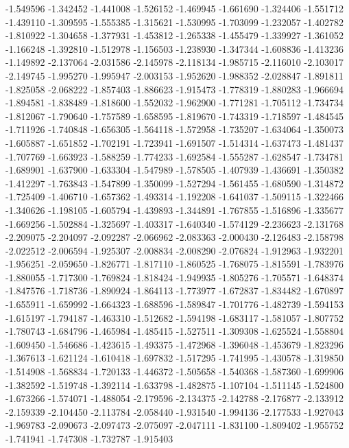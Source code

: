 -1.549596
-1.342452
-1.441008
-1.526152
-1.469945
-1.661690
-1.324406
-1.551712
-1.439110
-1.309595
-1.555385
-1.315621
-1.530995
-1.703099
-1.232057
-1.402782
-1.810922
-1.304658
-1.377931
-1.453812
-1.265338
-1.455479
-1.339927
-1.361052
-1.166248
-1.392810
-1.512978
-1.156503
-1.238930
-1.347344
-1.608836
-1.413236
-1.149892
-2.137064
-2.031586
-2.145978
-2.118134
-1.985715
-2.116010
-2.103017
-2.149745
-1.995270
-1.995947
-2.003153
-1.952620
-1.988352
-2.028847
-1.891811
-1.825058
-2.068222
-1.857403
-1.886623
-1.915473
-1.778319
-1.880283
-1.966694
-1.894581
-1.838489
-1.818600
-1.552032
-1.962900
-1.771281
-1.705112
-1.734734
-1.812067
-1.790640
-1.757589
-1.658595
-1.819670
-1.743319
-1.718597
-1.484545
-1.711926
-1.740848
-1.656305
-1.564118
-1.572958
-1.735207
-1.634064
-1.350073
-1.605887
-1.651852
-1.702191
-1.723941
-1.691507
-1.514314
-1.637473
-1.481437
-1.707769
-1.663923
-1.588259
-1.774233
-1.692584
-1.555287
-1.628547
-1.734781
-1.689901
-1.637900
-1.633304
-1.547989
-1.578505
-1.407939
-1.436691
-1.350382
-1.412297
-1.763843
-1.547899
-1.350099
-1.527294
-1.561455
-1.680590
-1.314872
-1.725409
-1.406710
-1.657362
-1.493314
-1.192208
-1.641037
-1.509115
-1.322466
-1.340626
-1.198105
-1.605794
-1.439893
-1.344891
-1.767855
-1.516896
-1.335677
-1.669256
-1.502884
-1.325697
-1.403317
-1.640340
-1.574129
-2.236623
-2.131768
-2.209075
-2.204097
-2.092287
-2.066962
-2.083363
-2.000430
-2.126483
-2.158798
-2.022512
-2.006594
-1.925307
-2.008834
-2.008290
-2.076824
-1.912963
-1.932201
-1.956251
-2.059650
-1.826771
-1.817110
-1.860525
-1.768075
-1.815591
-1.783976
-1.880055
-1.717300
-1.769824
-1.818424
-1.949935
-1.805276
-1.705571
-1.648374
-1.847576
-1.718736
-1.890924
-1.864113
-1.773977
-1.672837
-1.834482
-1.670897
-1.655911
-1.659992
-1.664323
-1.688596
-1.589847
-1.701776
-1.482739
-1.594153
-1.615197
-1.794187
-1.463310
-1.512682
-1.594198
-1.683117
-1.581057
-1.807752
-1.780743
-1.684796
-1.465984
-1.485415
-1.527511
-1.309308
-1.625524
-1.558804
-1.609450
-1.546686
-1.423615
-1.493375
-1.472968
-1.396048
-1.453679
-1.823296
-1.367613
-1.621124
-1.610418
-1.697832
-1.517295
-1.741995
-1.430578
-1.319850
-1.514908
-1.568834
-1.720133
-1.446372
-1.505658
-1.540368
-1.587360
-1.699906
-1.382592
-1.519748
-1.392114
-1.633798
-1.482875
-1.107104
-1.511145
-1.524800
-1.673266
-1.574071
-1.488054
-2.179596
-2.134375
-2.142788
-2.176877
-2.133912
-2.159339
-2.104450
-2.113784
-2.058440
-1.931540
-1.994136
-2.177533
-1.927043
-1.969783
-2.090673
-2.097473
-2.075097
-2.047111
-1.831100
-1.809402
-1.955752
-1.741941
-1.747308
-1.732787
-1.915403

